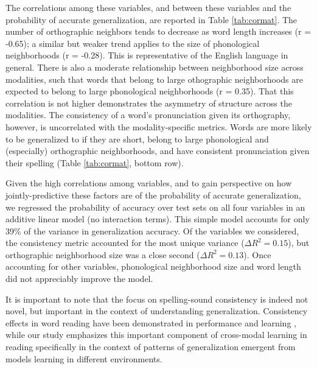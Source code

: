 \documentclass[10pt,letterpaper]{article}
\begin{document}
The correlations among these variables, and between these variables and the probability of accurate generalization, are reported in Table \ref{tab:cormat}.
The number of orthographic neighbors tends to decrease as word length increases (r = -0.65); a similar but weaker trend applies to the size of phonological neighborhoods (r = -0.28).
This is representative of the English language in general.
There is also a moderate relationship between neighborhood size across modalities, such that words that belong to large othographic neighborhoods are expected to belong to large phonological neighborhoods (r = 0.35).
That this correlation is not higher demonstrates the asymmetry of structure across the modalities.
The consistency of a word's pronunciation given its orthography, however, is uncorrelated with the modality-specific metrics.
Words are more likely to be generalized to if they are short, belong to large phonological and (especially) orthographic neighborhoods, and have consistent pronunciation given their spelling (Table \ref{tab:cormat}, bottom row).

Given the high correlations among variables, and to gain perspective on how jointly-predictive these factors are of the probability of accurate generalization, we regressed the probability of accuracy over test sets on all four variables in an additive linear model (no interaction terms).
This simple model accounts for only 39\% of the variance in generalization accuracy.
Of the variables we considered, the consistency metric accounted for the most unique variance ($\Delta R^2 = 0.15$), but orthographic neighborhood size was a close second ($\Delta R^2 = 0.13$). Once accounting for other variables, phonological neighborhood size and word length did not appreciably improve the model.

It is important to note that the focus on spelling-sound consistency is indeed not novel, but important in the context of understanding generalization. Consistency effects in word reading have been demonstrated in performance \cite{Jared1990,Plaut1996} and learning \cite{Seidenberg1989}, while our study emphasizes this important component of cross-modal learning in reading specifically in the context of patterns of generalization emergent from models learning in different environments.
\end{document}
